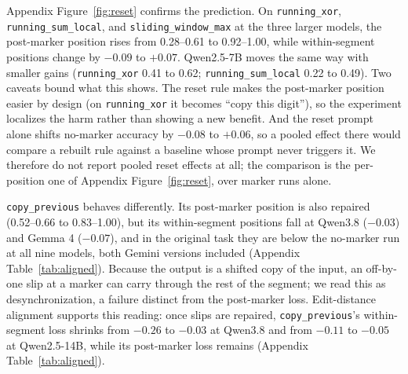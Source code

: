 \documentclass[10pt]{article} %
\newcommand{\task}[1]{\texttt{#1}}
\begin{document}
Appendix Figure~\ref{fig:reset} confirms the prediction. On \task{running\_xor}, \task{running\_sum\_local}, and \task{sliding\_window\_max} at the three larger models, the post-marker position rises from 0.28--0.61 to 0.92--1.00, while within-segment positions change by $-0.09$ to $+0.07$. Qwen2.5-7B moves the same way with smaller gains (\task{running\_xor} 0.41 to 0.62; \task{running\_sum\_local} 0.22 to 0.49). Two caveats bound what this shows. The reset rule makes the post-marker position easier by design (on \task{running\_xor} it becomes ``copy this digit''), so the experiment localizes the harm rather than showing a new benefit. And the reset prompt alone shifts no-marker accuracy by $-0.08$ to $+0.06$, so a pooled effect there would compare a rebuilt rule against a baseline whose prompt never triggers it. We therefore do not report pooled reset effects at all; the comparison is the per-position one of Appendix Figure~\ref{fig:reset}, over marker runs alone.

\task{copy\_previous} behaves differently. Its post-marker position is also repaired (0.52--0.66 to 0.83--1.00), but its within-segment positions fall at Qwen3.8 ($-0.03$) and Gemma 4 ($-0.07$), and in the original task they are below the no-marker run at all nine models, both Gemini versions included (Appendix Table~\ref{tab:aligned}). Because the output is a shifted copy of the input, an off-by-one slip at a marker can carry through the rest of the segment; we read this as desynchronization, a failure distinct from the post-marker loss. Edit-distance alignment supports this reading: once slips are repaired, \task{copy\_previous}'s within-segment loss shrinks from $-0.26$ to $-0.03$ at Qwen3.8 and from $-0.11$ to $-0.05$ at Qwen2.5-14B, while its post-marker loss remains (Appendix Table~\ref{tab:aligned}).
\end{document}
